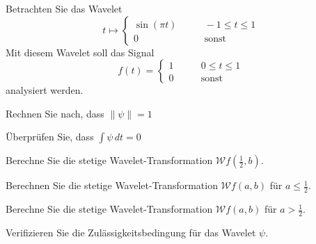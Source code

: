Betrachten Sie das Wavelet
\[
t\mapsto
\begin{cases}
\sin(\pi t)&\qquad -1 \le t\le 1\\
0&\qquad\text{sonst}
\end{cases}
\]
Mit diesem Wavelet soll das Signal
\[
f(t)
= 
\begin{cases}
1&\qquad 0\le t\le 1\\
0&\qquad\text{sonst}
\end{cases}
\]
analysiert werden.
\begin{teilaufgaben}
\item Rechnen Sie nach, dass $\|\psi\|=1$
\item Überprüfen Sie, dass $\int\psi\,dt=0$
\item Berechne Sie die stetige Wavelet-Transformation $\mathcal{W}f(\frac12,b)$.
\item Berechnen Sie die stetige Wavelet-Transformation $\mathcal{W}f(a,b)$
für $a\le\frac12$.
\item Berechne Sie die stetige Wavelet-Transformation $\mathcal{W}f(a,b)$
für $a >\frac12$.
\item Verifizieren Sie die Zulässigkeitsbedingung für das Wavelet $\psi$.
\end{teilaufgaben}

